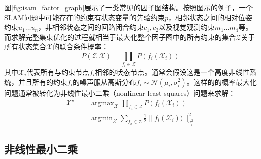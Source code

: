 图\ref{fig:isam_factor_graph}展示了一类常见的因子图结构。按照图示的例子，一个SLAM问题中可能存在的约束有状态变量的先验约束$p$，相邻状态之间的相对位姿约束$u_1 \dots u_n$，非相邻状态之间的回路闭合约束$c_1,c_2$以及视觉观测约束$m_1 \dots m_4$等。而求解完整集束优化的过程就相当于最大化整个因子图中的所有约束的集合$\mathcal{Z}$关于所有状态集合$\mathcal{X}$的联合条件概率：
\begin{equation}
    P(\mathcal{Z}|\mathcal{X}) = \prod_{f_i\in\mathcal{Z}} P(f_i(\mathcal{X}_i))
\end{equation}
其中$\mathcal{X}_i$代表所有与约束节点$f_i$相邻的状态节点。通常会假设这是一个高度非线性系统，并且所有的约束$f_i$的噪声服从高斯分布$f_i\sim\mathcal{N}(\mu_i, \sigma_i^2)$。这样的的概率最大化问题通常被转化为非线性最小二乘（nonlinear least squares）问题来求解：
\begin{equation}
\begin{aligned}
    \mathcal{X}^\star &= \mathop{\arg\max}_{\mathcal{X}}
                         \prod_{f_i\in\mathcal{Z}} P(f_i(\mathcal{X}_i)) \\
                      &= \mathop{\arg\min}_{\mathcal{X}}
                         \sum_{f_i\in\mathcal{Z}} \tfrac{1}{2}
                         \lVert f_i(\mathcal{X}_i)) \rVert_{\sigma_i^2}^2
\end{aligned}
\end{equation}

\subsection{非线性最小二乘}

